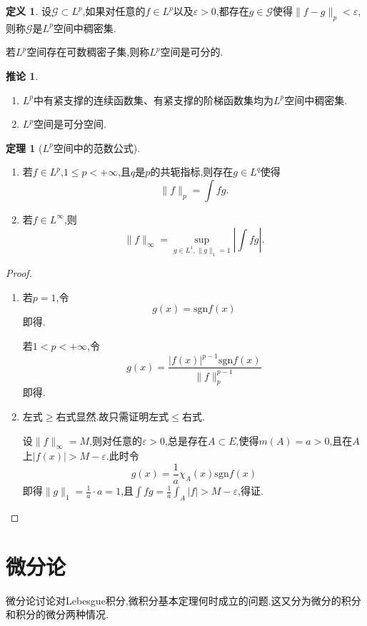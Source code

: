 \documentclass{ctexart}
\theoremstyle{definition}
\newtheorem{definition}{定义}
\newtheorem{theorem}{定理}
\newtheorem{corollary}{推论}
\theoremstyle{remark}
\begin{document}
	\begin{definition}
		设$\mathcal{G}\subset L^p$,如果对任意的$f\in L^p$以及$\varepsilon>0$,都存在$g\in\mathcal{G}$使得$\|f-g\|_p<\varepsilon$,则称$\mathcal{G}$是$L^p$空间中稠密集.
		
		若$L^p$空间存在可数稠密子集,则称$L^p$空间是可分的.
	\end{definition}
	\begin{corollary}\label{cor_Lp_dense_set}
		\hspace*{\fill}
		
		\begin{enumerate}
			\item $L^p$中有紧支撑的连续函数集、有紧支撑的阶梯函数集均为$L^p$空间中稠密集.
			\item $L^p$空间是可分空间.
		\end{enumerate}
	\end{corollary}
	
	\begin{theorem}[$L^p$空间中的范数公式]
		\hspace*{\fill}
		
		\begin{enumerate}
			\item 若$f\in L^p$,$1\le p<+\infty$,且$q$是$p$的共轭指标,则存在$g\in L^q$使得$$\|f\|_p=\int{fg}.$$
			\item 若$f\in L^\infty$,则$$\|f\|_\infty=\sup_{g\in L^1,\|g\|_1=1}{\left|\int{fg}\right|}.$$
		\end{enumerate}
	\end{theorem}
	\begin{proof}
		\begin{enumerate}
			\item 若$p=1$,令$$g(x)=\mathrm{sgn}f(x)$$即得.
			
			若$1<p<+\infty$,令$$g(x)=\frac{|f(x)|^{p-1}\mathrm{sgn}f(x)}{\|f\|_p^{p-1}}$$即得.
			
			\item 左式$\ge$右式显然.故只需证明左式$\le$右式.
			
			设$\|f\|_\infty=M$,则对任意的$\varepsilon>0$,总是存在$A\subset E$,使得$m(A)=a>0$,且在$A$上$|f(x)|>M-\varepsilon$.此时令
			$$g(x)=\frac{1}{a}\chi_A(x)\mathrm{sgn}f(x)$$
			即得$\|g\|_1=\frac{1}{a}\cdot a=1$,且$\int{fg}=\frac{1}{a}\int_A{|f|}>M-\varepsilon$,得证.
		\end{enumerate}
	\end{proof}
	
	\section{微分论}
	微分论讨论对Lebesgue积分,微积分基本定理何时成立的问题.这又分为微分的积分和积分的微分两种情况.
	
\end{document}
